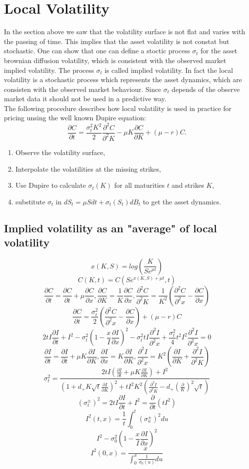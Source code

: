 \documentclass[12pt]{article}
\newcommand{\p}{\partial}
\begin{document}
\section{Local Volatility}
In the section above we saw that the volatility surface is not flat and varies with the passing of time. This implies that the asset volatility is not constat but stochastic. One can show that one can define a stoctic process $\sigma_t$ for the asset brownian diffusion volatility, which is consistent with the observed market implied volatility. The process $\sigma_t$ is called implied volatility. In fact the local volatility is a stochastic process which represents the asset dynamics, which are consisten with the observed market behaviour.
Since $\sigma_t$ depends of the observe market data it should not be used in a predictive way.\\
The following procedure describes how local volatility is used in practice for pricing unsing the well known Dupire equation:
$$\frac{\p C}{\p t}=\frac{\sigma_t^2 K^2}{2}\frac{\p^2 C}{\p^2 K}-\mu K \frac{\p C}{\p K}+(\mu-r)C.$$
\begin{enumerate}
\item Observe the volatility surface,
\item Interpolate the volatilities at the missing strikes,
\item Use Dupire to calculate $\sigma_t(K)$ for all maturities $t$ and strikes $K$,
\item substitute $\sigma_t$ in $dS_t=\mu Sdt + \sigma_t(S_t)dB_t$ to get the asset dynamics.
\end{enumerate}


\subsection{Implied volatility as an "average" of local volatility}
$$x(K,S)=log(\frac{K}{Se^{\mu t}})$$		
$$C(K,t)=C(Se^{x(K,S)+\mu t},t)$$
$$\frac{\p C}{\p t}=\frac{\p C}{\p t}+\mu\frac{\p C}{\p x},\frac{\p C}{\p K}=\frac{1}{K}\frac{\p C}{\p x},\frac{\p^2 C}{\p^2 K}=\frac{1}{K^2}(\frac{\p^2 C}{\p^2 x}-\frac{\p C}{\p x})$$
$$\frac{\p C}{\p t}=\frac{\sigma_t^2}{2}(\frac{\p^2 C}{\p^2 x}-\frac{\p C}{\p x})+(\mu-r)C$$
$$2tI\frac{\p I}{\p t}+I^2-\sigma_t^2(1-\frac{x}{I}\frac{\p I}{\p x})^2-\sigma_t^2 t I\frac{\p^2 I}{\p^2 x}+ \frac{\sigma_t^2}{4}t^2I^2\frac{\p^2I}{\p^2x}=0$$
$$\frac{\p I}{\p t}= \frac{\p I}{\p t}+\mu K \frac{\p I}{\p K}, \frac{\p I}{\p x}= K\frac{\p I}{\p K}, \frac{\p^2 I}{\p^2 x}=K^2(\frac{\p I}{\p K}+\frac{\p^2 I}{\p^2 K})$$
$$\sigma_t^2=\frac{2tI(\frac{\p I}{\p t}+\mu K\frac{\p I}{\p K})+I^2}{(1+d_+K\sqrt{t}\frac{\p I}{\p K})^2 + tI^2K^2(\frac{\p^2 I}{\p^2 K}-d_+(\frac{\p}{K})^2\sqrt{t})}$$
$$(\sigma_t^\pm)^2=2tI\frac{\partial I}{\partial t} + I^2=\frac{\partial}{\partial t}(tI^2)$$
$$I^2(t,x)=\frac{1}{t}\int_{0}^t(\sigma_u^\pm)^2du$$
$$I^2-\sigma_0^2( 1-\frac{x}{I}\frac{\partial I}{\partial x})^2$$
$$I^2(0,x)=\frac{x}{\int_0^x\frac{1}{\sigma_0(u)}du}$$
\end{document}
